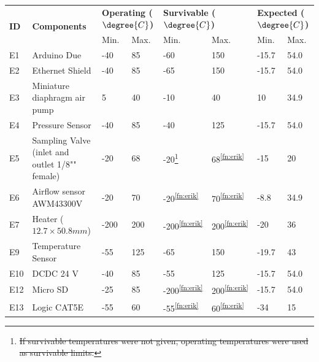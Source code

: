 \documentclass[a4paper,12pt,oneside]{article}
\providecommand{\DIFaddtex}[1]{{\protect\color{blue}\uwave{#1}}} %
\providecommand{\DIFdeltex}[1]{{\protect\color{red}\sout{#1}}}                      %
\providecommand{\DIFaddbegin}{} %
\providecommand{\DIFaddend}{} %
\providecommand{\DIFdelbegin}{} %
\providecommand{\DIFdelend}{} %
\providecommand{\DIFadd}[1]{\texorpdfstring{\DIFaddtex{#1}}{#1}} %
\providecommand{\DIFdel}[1]{\texorpdfstring{\DIFdeltex{#1}}{}} %
\newcommand{\DIFscaledelfig}{0.5}
\newlength{\DIFdelgraphicswidth} %
\newlength{\DIFdelgraphicsheight} %
\newcommand{\DIFaddincludegraphics}[2][]{{\color{blue}\fbox{\DIFOincludegraphics[#1]{#2}}}} %
\newcommand{\DIFdelincludegraphics}[2][]{%
\sbox{\DIFdelgraphicsbox}{\DIFOincludegraphics[#1]{#2}}%
\settoboxwidth{\DIFdelgraphicswidth}{\DIFdelgraphicsbox} %
\settoboxtotalheight{\DIFdelgraphicsheight}{\DIFdelgraphicsbox} %
\scalebox{\DIFscaledelfig}{%
\parbox[b]{\DIFdelgraphicswidth}{\usebox{\DIFdelgraphicsbox}\\[-\baselineskip] \rule{\DIFdelgraphicswidth}{0em}}\llap{\resizebox{\DIFdelgraphicswidth}{\DIFdelgraphicsheight}{%
\setlength{\unitlength}{\DIFdelgraphicswidth}%
\begin{picture}(1,1)%
\thicklines\linethickness{2pt} %
{\color[rgb]{1,0,0}\put(0,0){\framebox(1,1){}}}%
{\color[rgb]{1,0,0}\put(0,0){\line( 1,1){1}}}%
{\color[rgb]{1,0,0}\put(0,1){\line(1,-1){1}}}%
\end{picture}%
}\hspace*{3pt}}} %
} %
\DeclareRobustCommand{\DIFaddbegin}{\DIFOaddbegin \let\includegraphics\DIFaddincludegraphics} %
\DeclareRobustCommand{\DIFaddend}{\DIFOaddend \let\includegraphics\DIFOincludegraphics} %
\DeclareRobustCommand{\DIFdelbegin}{\DIFOdelbegin \let\includegraphics\DIFdelincludegraphics} %
\DeclareRobustCommand{\DIFdelend}{\DIFOaddend \let\includegraphics\DIFOincludegraphics} %
\begin{document}
\begin{appendices}
\begin{longtable}{|m{1cm}|m{3.5cm}|m{1.3cm}|m{1.3cm}|m{1.4cm}|m{1.3cm}|m{1.3cm}|m{1.3cm}|}
\hline
\multirow{2}{*}{\textbf{ID}} & \multirow{2}{*}{\textbf{Components}}                                 & \multicolumn{2}{l|}{\textbf{Operating ($\degree{C}$)}} & \multicolumn{2}{l|}{\textbf{Survivable ($\degree{C}$)}} & \multicolumn{2}{l|}{\textbf{Expected ($\degree{C}$)}} \\ \cline{3-8} &   & Min.  & Max.  & Min.  & Max.  &  Min.   &  Max.            \\ \hline
E1 & Arduino Due & -40 & 85 & -60 & 150 & -15.7 & 54.0 \\ \hline
E2 & Ethernet Shield & -40 & 85 & -65 & 150 & -15.7 & 54.0 \\ \hline
E3 & Miniature diaphragm air pump & 5 & 40 & -10 & 40 & 10 & 34.9 \\ \hline
E4 & Pressure Sensor & -40 & 85 & -40 & 125 & -15.7 & 54.0 \\ \hline
E5 & Sampling Valve (inlet and outlet 1/8"" female) & -20 & 68 & -20\DIFdelbegin \footnote{\DIFdel{If survivable temperatures were not given, operating temperatures were used as survivable limits.}%
} %
\addtocounter{footnote}{-1}%
\DIFdelend \DIFaddbegin \DIFadd{\textsuperscript{\ref{fn:erik}} }\DIFaddend & 68\textsuperscript{\ref{fn:erik}} & -15 & 20 \\ \hline
E6 & Airflow sensor AWM43300V & -20 & 70 & -20\textsuperscript{\ref{fn:erik}} & 70\textsuperscript{\ref{fn:erik}} & -8.8 & 34.9 \\ \hline
E7 & Heater ($12.7\times 50.8 mm$) & -200 & 200 & -200\textsuperscript{\ref{fn:erik}} & 200\textsuperscript{\ref{fn:erik}} & -20 & 36 \\ \hline
E9 & Temperature Sensor & -55 & 125 & -65 & 150 & -19.7 & 43 \\ \hline
E10 & DCDC 24 V & -40 & 85 & -55 & 125 & -15.7 & 54.0 \\ \hline
E12 & Micro SD & -25 & 85 & -200\textsuperscript{\ref{fn:erik}} & 200\textsuperscript{\ref{fn:erik}} & -15.7 & 54.0 \\ \hline
E13 & Logic CAT5E & -55 & 60 & -55\textsuperscript{\ref{fn:erik}} & 60\textsuperscript{\ref{fn:erik}} & -34 & 15 \\ \hline

\end{longtable}
\end{appendices}
\end{document}
